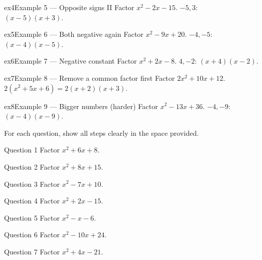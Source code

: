 \documentclass[11pt]{article}
\begin{document}
\begin{example}{ex4}{Example 5 --- Opposite signs II}
Factor $x^2-2x-15$.
\soln $-5,3$: $(x-5)(x+3).$
\end{example}

\begin{example}{ex5}{Example 6 --- Both negative again}
Factor $x^2-9x+20$.
\soln $-4,-5$: $(x-4)(x-5).$
\end{example}

\begin{example}{ex6}{Example 7 --- Negative constant}
Factor $x^2+2x-8$.
\soln $4,-2$: $(x+4)(x-2).$
\end{example}

\begin{example}{ex7}{Example 8 --- Remove a common factor first}
Factor $2x^2+10x+12$.
\soln $2(x^2+5x+6)=2(x+2)(x+3).$
\end{example}

\begin{example}{ex8}{Example 9 --- Bigger numbers (harder)}
Factor $x^2-13x+36$.
\soln $-4,-9$: $(x-4)(x-9).$
\end{example}

\clearpage
{}
For each question, show all steps clearly in the space provided.

\begin{qbox}{Question 1}
Factor $x^2+6x+8$.\workspace{1.8cm}
\end{qbox}

\begin{qbox}{Question 2}
Factor $x^2+8x+15$.\workspace{1.8cm}
\end{qbox}

\begin{qbox}{Question 3}
Factor $x^2-7x+10$.\workspace{1.8cm}
\end{qbox}

\begin{qbox}{Question 4}
Factor $x^2+2x-15$.\workspace{1.8cm}
\end{qbox}

\begin{qbox}{Question 5}
Factor $x^2-x-6$.\workspace{1.8cm}
\end{qbox}

\begin{qbox}{Question 6}
Factor $x^2-10x+24$.\workspace{1.8cm}
\end{qbox}

\begin{qbox}{Question 7}
Factor $x^2+4x-21$.\workspace{1.8cm}
\end{qbox}
\end{document}
